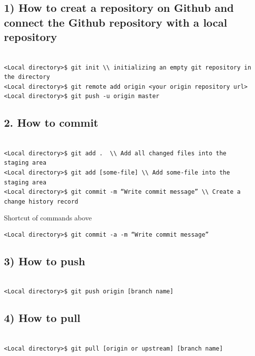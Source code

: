 \documentclass[fleqn,10pt]{wlscirep}
\begin{document}
\subsection*{1) How to creat a repository on Github and connect the Github repository with a local repository}
\begin{verbatim}

<Local directory>$ git init \\ initializing an empty git repository in the directory
<Local directory>$ git remote add origin <your origin repository url>
<Local directory>$ git push -u origin master

\end{verbatim}

\subsection*{2. How to commit}

\begin{verbatim}

<Local directory>$ git add .  \\ Add all changed files into the staging area
<Local directory>$ git add [some-file] \\ Add some-file into the staging area
<Local directory>$ git commit -m “Write commit message” \\ Create a change history record

\end{verbatim}

Shortcut of commands above
\begin{verbatim}
<Local directory>$ git commit -a -m “Write commit message”

\end{verbatim}


\subsection*{3) How to push}
\begin{verbatim}

<Local directory>$ git push origin [branch name]

\end{verbatim}


\subsection*{4) How to pull}
\begin{verbatim}

<Local directory>$ git pull [origin or upstream] [branch name]

\end{verbatim}
\end{document}
